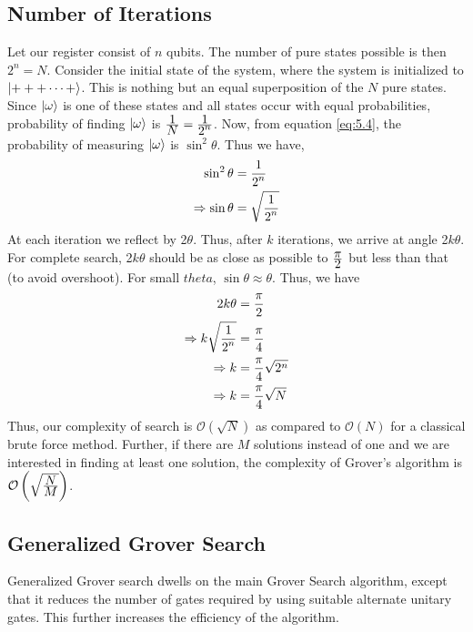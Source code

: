 \subsection{Number of Iterations}
Let our register consist of $n$ qubits. The number of pure states possible is then $2^n=N$. Consider the initial state of the system, where the system is initialized to $\left\vert +++\cdots+\right\rangle$. This is nothing but an equal superposition of the $N$ pure states. Since $\left\vert \omega\right\rangle$ is one of these states and all states occur with equal probabilities, probability of finding $\left\vert \omega\right\rangle$ is $\frac{\displaystyle 1}{\displaystyle N}=\frac{\displaystyle 1}{\displaystyle 2^n}$. Now, from equation \ref{eq:5.4}, the probability of measuring $\left\vert \omega\right\rangle$ is $\sin^2\theta$. Thus we have,
\begin{equation}
\label{eq:5.8}
\begin{split}
\sin^2\theta&=\frac{\displaystyle 1}{\displaystyle 2^n}\\
\Rightarrow \sin\theta&=\sqrt{\frac{\displaystyle 1}{\displaystyle 2^n}}\\
\end{split}
\end{equation}
At each iteration we reflect by 2$\theta$. Thus, after $k$ iterations, we arrive at angle 2$k\theta$. For complete search, 2$k\theta$ should be as close as possible to $\frac{\displaystyle \pi}{\displaystyle 2}$ but less than that (to avoid overshoot). For small $theta$, $\sin\theta\approx\theta$. Thus, we have
\begin{equation}
\label{eq:5.9}
\begin{split}
2k\theta&=\frac{\displaystyle \pi}{\displaystyle 2}\\
\Rightarrow k\sqrt{\frac{\displaystyle 1}{\displaystyle 2^n}}&=\frac{\displaystyle \pi}{\displaystyle 4}\\
\Rightarrow k&=\frac{\displaystyle \pi}{\displaystyle 4}\sqrt{2^n}\\
\Rightarrow k&=\frac{\displaystyle \pi}{\displaystyle 4}\sqrt{N}
\end{split}
\end{equation}
Thus, our complexity of search is $\mathcal{O}(\sqrt{N})$ as compared to $\mathcal{O}(N)$ for a classical brute force method. Further, if there are $M$ solutions instead of one and we are interested in finding at least one solution, the complexity of Grover's algorithm is $\mathcal{O}\left(\sqrt{\frac{\displaystyle N}{\displaystyle M}}\right)$.


\subsection{Generalized Grover Search}
Generalized Grover search\cite{gengrov} dwells on the main Grover Search algorithm, except that it reduces the number of gates required by using suitable alternate unitary gates. This further increases the efficiency of the algorithm. 